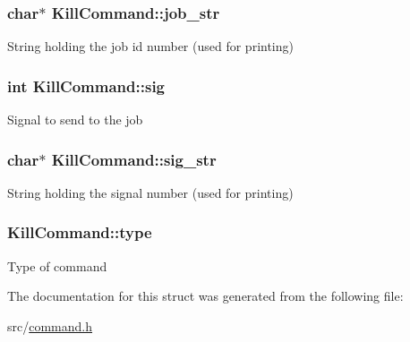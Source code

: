 \subsubsection[{\texorpdfstring{job\+\_\+str}{job\_str}}]{\setlength{\rightskip}{0pt plus 5cm}char$\ast$ Kill\+Command\+::job\+\_\+str}\hypertarget{structKillCommand_a174a9714a69550b0bbf611e59bfbf332}{}\label{structKillCommand_a174a9714a69550b0bbf611e59bfbf332}
String holding the job id number (used for printing) 
\subsubsection[{\texorpdfstring{sig}{sig}}]{\setlength{\rightskip}{0pt plus 5cm}int Kill\+Command\+::sig}\hypertarget{structKillCommand_a20f5367bbec80a936189c57b1f9db351}{}\label{structKillCommand_a20f5367bbec80a936189c57b1f9db351}
Signal to send to the job 
\subsubsection[{\texorpdfstring{sig\+\_\+str}{sig\_str}}]{\setlength{\rightskip}{0pt plus 5cm}char$\ast$ Kill\+Command\+::sig\+\_\+str}\hypertarget{structKillCommand_a879a36b90427ec640bef5c92a6c9c24e}{}\label{structKillCommand_a879a36b90427ec640bef5c92a6c9c24e}
String holding the signal number (used for printing) 
\subsubsection[{\texorpdfstring{type}{type}}]{ Kill\+Command\+::type}\hypertarget{structKillCommand_a9cd678bc0659f74340e3fca28766bcda}{}\label{structKillCommand_a9cd678bc0659f74340e3fca28766bcda}
Type of command 

The documentation for this struct was generated from the following file\+:\begin{DoxyCompactItemize}
\item 
src/\hyperlink{command_8h}{command.\+h}\end{DoxyCompactItemize}
